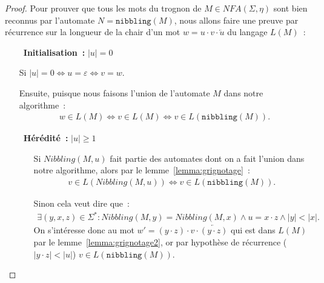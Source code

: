 \begin{proof}
  Pour prouver que tous les mots du trognon de \(M \in NFA(\Sigma, \eta)\)
  sont bien reconnus par l'automate \(N = \texttt{nibbling}(M)\), nous allons
  faire une preuve par récurrence sur la longueur de la chair d'un mot \(w =
  u \cdot v \cdot \overleftarrow{u}\) du langage \(L(M)\)~:

  \vphantom{}

  \begin{itemize}
    \item[\bullet~\textbf{Initialisation~:}] \(\lvert u \rvert = 0\)

      Si \(\lvert u \rvert = 0 \Longleftrightarrow u = \varepsilon
      \Longleftrightarrow v = w\).

      \vphantom{}
      
      Ensuite, puisque nous faisons l'union de l'automate \(M\) dans notre
      algorithme~:
      \begin{align*}
        w \in L(M) \Longleftrightarrow v \in L(M) \Longleftrightarrow v \in
        L(\texttt{nibbling}(M)).
      \end{align*}

    \item[\bullet~\textbf{Hérédité~:}] \(\lvert u \rvert \geq 1\)
      \begin{itemize}
        \item[\circ] Si \(Nibbling(M, u)\) fait partie des automates dont on a
          fait l'union dans notre algorithme, alors par le
          lemme~\ref{lemma:grignotage}~:
          \begin{align*}
              v \in L(Nibbling(M, u)) \Longleftrightarrow v \in
              L(\texttt{nibbling}(M)).
          \end{align*}

        \item[\circ] Sinon cela veut dire que~:
          \begin{align*}
            \exists (y, x, z) \in \Sigma^* \colon Nibbling(M, y) = 
            Nibbling(M, x) \land u = x \cdot z \land \lvert y \rvert < \lvert x 
            \rvert.
          \end{align*}
          On s'intéresse donc au mot \(w' =  (y \cdot z) \cdot v \cdot
          \overleftarrow{(y \cdot z)}\) qui est dans \(L(M)\) par le
          lemme~\ref{lemma:grignotage2}, or par hypothèse de récurrence
          (\(\lvert y \cdot z \rvert < \lvert u \rvert\)) \(v \in
          L(\texttt{nibbling}(M))\).
      \end{itemize}
  \end{itemize}
\end{proof}

